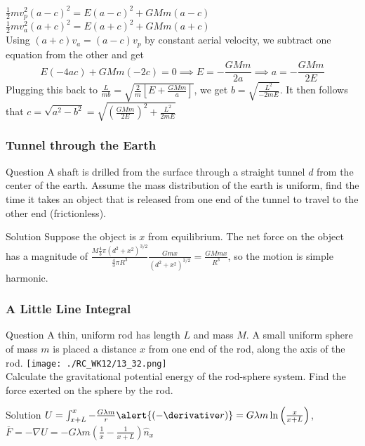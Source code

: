 \begin{frame}
$\frac{1}{2}mv_p^2(a-c)^2=E(a-c)^2+GMm(a-c)$\\$\frac{1}{2}mv_a^2(a+c)^2=E(a+c)^2+GMm(a+c)$\\
Using $(a+c)v_a=(a-c)v_p$ by constant aerial velocity, we subtract one equation from the other and get
\[E(-4ac)+GMm(-2c)=0\implies E=-\frac{GMm}{2a}\implies a=-\frac{GMm}{2E}\]
Plugging this back to $\frac{L}{mb}=\sqrt{\frac{2}{m}\left[E+\frac{GMm}{a}\right]}$, we get $b=\sqrt{\frac{L^2}{-2mE}}$. It then follows that $c=\sqrt{a^2-b^2}=\sqrt{\left(\frac{GMm}{2E}\right)^2+\frac{L^2}{2mE}}$
\end{frame}
\begin{frame}
\frametitle{Tunnel through the Earth}
\begin{block}{Question}
A shaft is drilled from the surface through a straight tunnel $d$ from the center of the earth. Assume the mass distribution of the earth is uniform, find the time it takes an object that is released from one end of the tunnel to travel to the other end (frictionless).
\end{block}
\begin{block}{Solution}
Suppose the object is $x$ from equilibrium. The net force on the object has a magnitude of $\frac{M\frac{4}{3}\pi (d^2+x^2)^{3/2}}{\frac{4}{3}\pi R^3}\frac{Gmx}{(d^2+x^2)^{3/2}}=\frac{GMmx}{R^3}$, so the motion is simple harmonic.
\end{block}
\end{frame}
\begin{frame}
\frametitle{A Little Line Integral}
\begin{block}{Question}
A thin, uniform rod has length $L$ and mass $M$. A small uniform sphere of mass $m$ is placed a distance $x$ from one end of the rod, along the axis of the rod.
\texttt{[image: ./RC\_WK12/13\_32.png]}\\
Calculate the gravitational potential energy of the rod-sphere system. Find the force exerted on the sphere by the rod.
\end{block}
\begin{block}{Solution}
$U=\int_{x+L}^{x}-\frac{G\lambda m}{r}\alert{(-\derivative r)}=G\lambda m\ln\left(\frac{x}{x+L}\right)$, $\overline F=-\nabla U=-G\lambda m\left(\frac{1}{x}-\frac{1}{x+L}\right)\hat n_x$
\end{block}
\end{frame}

